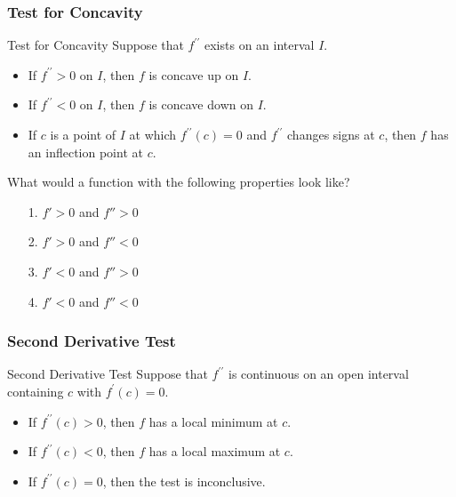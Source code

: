 \documentclass[cal1spr16Lectures.tex]{subfiles}
\begin{document}
\subsubsection{Test for Concavity}

\begin{frame}{\small Test for Concavity}
Suppose that $f^{\prime\prime}$ exists on an interval $I$.

\begin{itemize}
\item If $f^{\prime\prime}>0$ on $I$, then $f$ is \alert{concave up} on $I$.

\vspace{0.5pc}
\item If $f^{\prime\prime}<0$ on $I$, then $f$ is \alert{concave down} on $I$.

\vspace{0.5pc}
\item If $c$ is a point of $I$ at which $f^{\prime\prime}(c)=0$ and $f^{\prime\prime}$ changes signs at $c$, then $f$ has an \alert{inflection point} at $c$.
\end{itemize}
\end{frame}

\begin{frame}
\begin{ex}
What would a function with the following properties look like?
\begin{itemize}
\item[1. ] $f'>0$ and $f''>0$
\item[2. ] $f'>0$ and $f''<0$
\item[3. ] $f'<0$ and $f''>0$
\item[4. ] $f'<0$ and $f''<0$ 
\end{itemize}
\end{ex}
\end{frame}

\subsubsection{Second Derivative Test}

\begin{frame}{\small Second Derivative Test}
Suppose that $f^{\prime\prime}$ is continuous on an open interval containing $c$ with $f^{\prime}(c)=0$.

\begin{itemize}
\item If $f^{\prime\prime}(c)>0$, then $f$ has a \alert{local minimum} at $c$.

\vspace{0.5pc}
\item If $f^{\prime\prime}(c)<0$, then $f$ has a \alert{local maximum} at $c$.

\vspace{0.5pc}
\item If $f^{\prime\prime}(c)=0$, then the test is inconclusive.
\end{itemize}

\end{frame}
\end{document}
